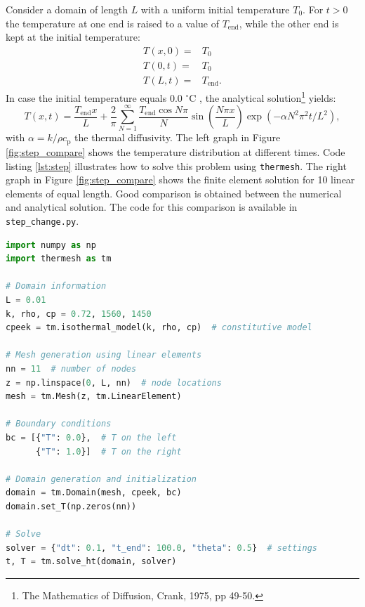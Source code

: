 \documentclass[10pt, a4paper, twoside, headinclude,footinclude, BCOR5mm]{scrartcl}
\begin{document}
Consider a domain of length \(L\) with a uniform initial temperature \(T_0\). For \(t>0\) the temperature at one end is raised to a value of \(T_{\text{end}}\), while the other end is kept at the initial temperature:
\begin{eqnarray*}
  T(x, 0) =& T_0\\
  T(0, t) =& T_0\\
  T(L, t) =& T_{\text{end}}.
\end{eqnarray*}
In case the initial temperature equals 0.0 \(^{\circ}\)C , the analytical solution\footnote{The Mathematics of Diffusion, Crank, 1975, pp 49-50.} yields:
\begin{equation*}
T(x,t) = \frac{T_{\text{end}}x}{L} + \frac{2}{\pi}
       \sum_{N=1}^{\infty} \frac{T_{\text{end}} \cos N\pi}{N}
       \sin\left(\frac{N\pi x}{L}\right)
       \exp\left(-\alpha N^2 \pi^2 t / L^2 \right),
\end{equation*}
with \(\alpha = k/\rho c_{\text{p}}\) the thermal diffusivity. The left graph in Figure \ref{fig:step_compare} shows the temperature distribution at different times. Code listing \ref{lst:step} illustrates how to solve this problem using \texttt{thermesh}. The right graph in Figure \ref{fig:step_compare} shows the finite element solution for 10 linear elements of equal length. Good comparison is obtained between the numerical and analytical solution. The code for this comparison is available in \texttt{step\_change.py}.

\lstset{basicstyle=\ttfamily}
\begin{minipage}{\linewidth}
\label{code:step}
\begin{lstlisting}[language=Python, caption=Thermesh example for a step change at one end., label={lst:step}, backgroundcolor=\color{light-gray}]
import numpy as np
import thermesh as tm

# Domain information
L = 0.01
k, rho, cp = 0.72, 1560, 1450
cpeek = tm.isothermal_model(k, rho, cp)  # constitutive model

# Mesh generation using linear elements
nn = 11  # number of nodes
z = np.linspace(0, L, nn)  # node locations
mesh = tm.Mesh(z, tm.LinearElement)

# Boundary conditions
bc = [{"T": 0.0},  # T on the left
      {"T": 1.0}]  # T on the right

# Domain generation and initialization
domain = tm.Domain(mesh, cpeek, bc)
domain.set_T(np.zeros(nn))

# Solve
solver = {"dt": 0.1, "t_end": 100.0, "theta": 0.5}  # settings
t, T = tm.solve_ht(domain, solver)
\end{lstlisting}
\end{minipage}
\end{document}
